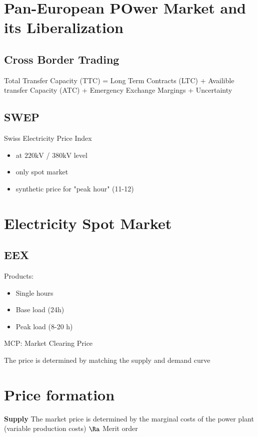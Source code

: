 \documentclass[fs, footer]{latex4ei}
\begin{document}
\begin{multicols*}{4}
\section{Pan-European POwer Market and its Liberalization} 

\subsection*{Cross Border Trading} 

Total Transfer Capacity (TTC) = Long Term Contracts (LTC) + Availible transfer Capacity (ATC) + Emergency Exchange Margings + Uncertainty

\subsection*{SWEP} Swiss Electricity Price Index
\begin{itemize}
	\item at $220 \si{\kilo \volt}$ / $380 \si{\kilo \volt}$ level
	\item only spot market
	\item synthetic price for "peak hour" (11-12)
\end{itemize}

\section{Electricity Spot Market}
\subsection*{EEX}
Products:
\begin{itemize}
 	\item Single hours
 	\item Base load (24h)
 	\item Peak load (8-20 h)
 \end{itemize} 

 MCP: Market Clearing Price

 The price is determined by matching the supply and demand curve

 \section{Price formation} 

 \textbf{Supply} 
 The market price is determined by the marginal costs of the power plant (variable production costs)
 $\Ra$ Merit order 


\end{multicols*}
\end{document}

